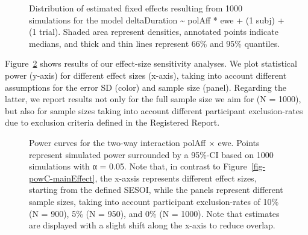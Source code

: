 \documentclass[
  letterpaper,
  DIV=11,
  numbers=noendperiod]{scrartcl}
\begin{document}
\begin{figure}[H]
{{}

\subcaption{\label{fig-checkSims-twoWayInt}}

}

\caption{\label{fig-checkSims-twoWayInt}Distribution of estimated fixed
effects resulting from 1000 simulations for the model deltaDuration
\textasciitilde{} polAff * ewe + (1 \textbar{} subj) + (1 \textbar{}
trial). Shaded area represent densities, annotated points indicate
medians, and thick and thin lines represent 66\% and 95\% quantiles.}

\end{figure}%

Figure~\ref{fig-powC-twoWayInt} shows results of our effect-size
sensitivity analyses. We plot statistical power (y-axis) for different
effect sizes (x-axis), taking into account different assumptions for the
error SD (color) and sample size (panel). Regarding the latter, we
report results not only for the full sample size we aim for (N = 1000),
but also for sample sizes taking into account different participant
exclusion-rates due to exclusion criteria defined in the Registered
Report.

\begin{figure}


\caption{\label{fig-powC-twoWayInt}Power curves for the two-way
interaction polAff × ewe. Points represent simulated power surrounded by
a 95\%-CI based on 1000 simulations with α = 0.05. Note that, in
contrast to Figure~\ref{fig-powC-mainEffect}, the x-axsis represents
different effect sizes, starting from the defined SESOI, while the
panels represent different sample sizes, taking into account participant
exclusion-rates of 10\% (N = 900), 5\% (N = 950), and 0\% (N = 1000).
Note that estimates are displayed with a slight shift along the x-axis
to reduce overlap.}

\end{figure}%
\end{document}
